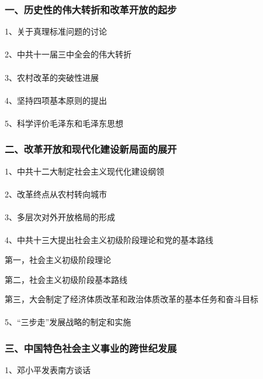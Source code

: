 \documentclass{ctexart}
\begin{document}
\subsubsection{一、历史性的伟大转折和改革开放的起步}

1、关于真理标准问题的讨论
\\\\

2、中共十一届三中全会的伟大转折
\\\\

3、农村改革的突破性进展
\\\\

4、坚持四项基本原则的提出
\\\\

5、科学评价毛泽东和毛泽东思想



\subsubsection{二、改革开放和现代化建设新局面的展开}

1、中共十二大制定社会主义现代化建设纲领
\\\\

2、改革终点从农村转向城市
\\\\

3、多层次对外开放格局的形成
\\\\

4、中共十三大提出社会主义初级阶段理论和党的基本路线

第一，社会主义初级阶段理论

第二，社会主义初级阶段基本路线

第三，大会制定了经济体质改革和政治体质改革的基本任务和奋斗目标
\\\\



5、“三步走”发展战略的制定和实施

\subsubsection{三、中国特色社会主义事业的跨世纪发展}

1、邓小平发表南方谈话
\\\\
\end{document}
